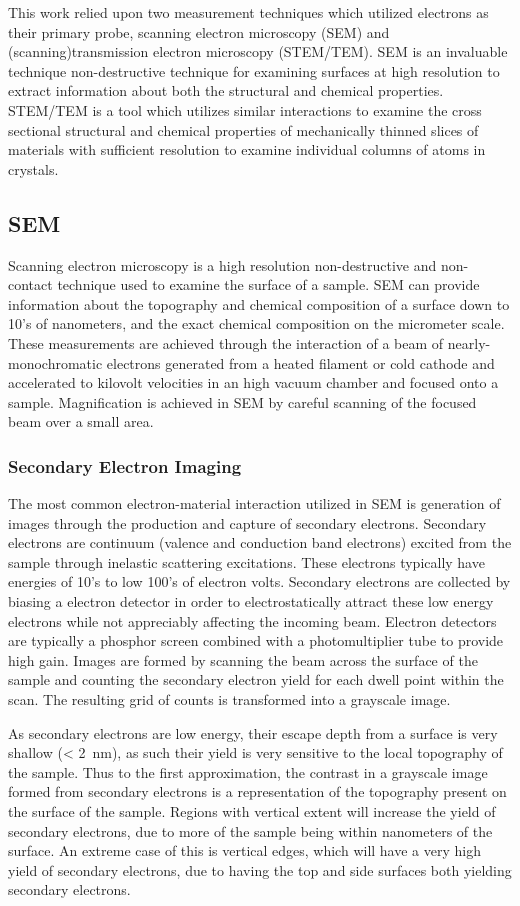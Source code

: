 This work relied upon two measurement techniques which utilized electrons as their primary probe, scanning electron microscopy (SEM) and (scanning)transmission electron microscopy (STEM/TEM). SEM is an invaluable technique non-destructive technique for examining surfaces at high resolution to extract information about both the structural and chemical properties. STEM/TEM is a tool which utilizes similar interactions to examine the cross sectional structural and chemical properties of mechanically thinned slices of materials with sufficient resolution to examine individual columns of atoms in crystals.
\subsection{SEM}
Scanning electron microscopy is a high resolution non-destructive and non-contact technique used to examine the surface of a sample. SEM can provide information about the topography and chemical composition of a surface down to 10's of nanometers, and the exact chemical composition on the micrometer scale. These measurements are achieved through the interaction of a beam of nearly-monochromatic electrons generated from a heated filament or cold cathode and accelerated to kilovolt velocities in an high vacuum chamber and focused onto a sample. Magnification is achieved in SEM by careful scanning of the focused beam over a small area.

\subsubsection{Secondary Electron Imaging}
The most common electron-material interaction utilized in SEM is generation of images through the production and capture of secondary electrons. Secondary electrons are continuum (valence and conduction band electrons) excited from the sample through inelastic scattering excitations. These electrons typically have energies of 10's to low 100's of electron volts. Secondary electrons are collected by biasing a electron detector in order to electrostatically attract these low energy electrons while not appreciably affecting the incoming beam. Electron detectors are typically a phosphor screen combined with a photomultiplier tube to provide high gain. Images are formed by scanning the beam across the surface of the sample and counting the secondary electron yield for each dwell point within the scan. The resulting grid of counts is transformed into a grayscale image.

As secondary electrons are low energy, their escape depth from a surface is very shallow (< 2~nm), as such their yield is very sensitive to the local topography of the sample. Thus to the first approximation, the contrast in a grayscale image formed from secondary electrons is a representation of the topography present on the surface of the sample. Regions with vertical extent will increase the yield of secondary electrons, due to more of the sample being within nanometers of the surface. An extreme case of this is vertical edges, which will have a very high yield of secondary electrons, due to having the top and side surfaces both yielding secondary electrons.

